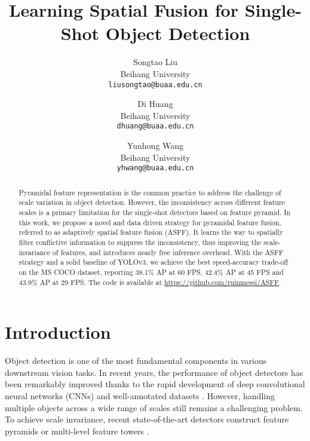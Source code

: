 \documentclass[10pt,twocolumn,letterpaper]{article}
\begin{document}
\title{Learning Spatial Fusion for Single-Shot Object Detection}

\author{Songtao Liu\\
Beihang University\\
{\tt\small liusongtao@buaa.edu.cn}
\and
Di Huang\\
Beihang University\\
{\tt\small dhuang@buaa.edu.cn}
\and
Yunhong Wang\\
Beihang University\\
{\tt\small yhwang@buaa.edu.cn}
}

\maketitle


\begin{abstract}
	Pyramidal feature representation is the common practice to address the challenge of scale variation in object detection. However, the inconsistency across different feature scales is a primary limitation for the single-shot detectors based on feature pyramid. In this work, we propose a novel and data driven strategy for pyramidal feature fusion, referred to as adaptively spatial feature fusion (ASFF). It learns the way to spatially filter conflictive information to suppress the inconsistency, thus improving the scale-invariance of features, and introduces nearly free inference overhead. With the ASFF strategy and a solid baseline of YOLOv3, we achieve the best speed-accuracy trade-off on the MS COCO dataset, reporting 38.1\% AP at 60 FPS, 42.4\% AP at 45 FPS and 43.9\% AP at 29 FPS. The code is available at \url{https://github.com/ruinmessi/ASFF}.
\end{abstract}

\section{Introduction}

Object detection is one of the most fundamental components in various downstream vision tasks. In recent years, the performance of object detectors has been remarkably improved thanks to the rapid development of deep convolutional neural networks (CNNs) \cite{alexnet,vgg,resnet,inceptionv1} and well-annotated datasets \cite{Pascal-voc,ms-coco}. However, handling multiple objects across a wide range of scales still remains a challenging problem. To achieve scale invariance, recent state-of-the-art detectors construct feature pyramids or multi-level feature towers \cite{ssd,FPN,yolov3,mask-rcnn,focal-loss}.
\end{document}

